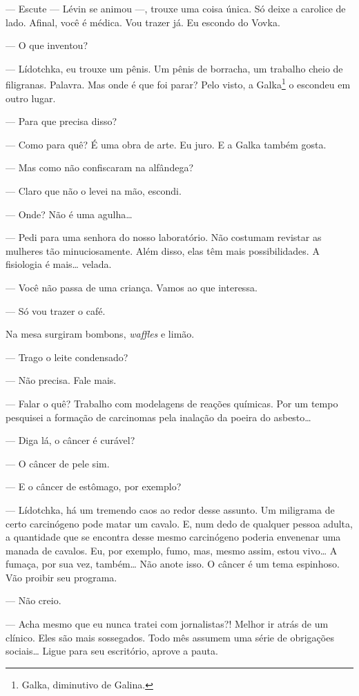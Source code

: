 --- Escute --- Lévin se animou ---, trouxe uma coisa única. Só deixe a
carolice de lado. Afinal, você é médica. Vou trazer já. Eu escondo do
Vovka.

--- O que inventou?

--- Lídotchka, eu trouxe um pênis. Um pênis de borracha, um trabalho
cheio de filigranas. Palavra. Mas onde é que foi parar? Pelo visto, a
Galka\footnote{Galka, diminutivo de Galina.} o escondeu em outro lugar.

--- Para que precisa disso?

--- Como para quê? É uma obra de arte. Eu juro. E a Galka também gosta.

--- Mas como não confiscaram na alfândega?

--- Claro que não o levei na mão, escondi.

--- Onde? Não é uma agulha\ldots{}

--- Pedi para uma senhora do nosso laboratório. Não costumam revistar as
mulheres tão minuciosamente. Além disso, elas têm mais possibilidades. A
fisiologia é mais\ldots{} velada.

--- Você não passa de uma criança. Vamos ao que interessa.

--- Só vou trazer o café.

Na mesa surgiram bombons, \emph{waffles} e limão.

--- Trago o leite condensado?

--- Não precisa. Fale mais.

--- Falar o quê? Trabalho com modelagens de reações químicas. Por um
tempo pesquisei a formação de carcinomas pela inalação da poeira do
asbesto\ldots{}

--- Diga lá, o câncer é curável?

--- O câncer de pele sim.

--- E o câncer de estômago, por exemplo?

--- Lídotchka, há um tremendo caos ao redor desse assunto. Um miligrama
de certo carcinógeno pode matar um cavalo. E, num dedo de qualquer
pessoa adulta, a quantidade que se encontra desse mesmo carcinógeno
poderia envenenar uma manada de cavalos. Eu, por exemplo, fumo, mas,
mesmo assim, estou vivo\ldots{} A fumaça, por sua vez, também\ldots{} Não anote
isso. O câncer é um tema espinhoso. Vão proibir seu programa.

--- Não creio.

--- Acha mesmo que eu nunca tratei com jornalistas?! Melhor ir atrás de
um clínico. Eles são mais sossegados. Todo mês assumem uma série de
obrigações sociais\ldots{} Ligue para seu escritório, aprove a pauta.

